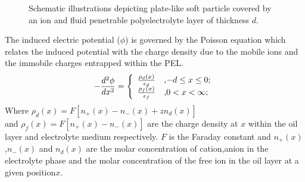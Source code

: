 \documentclass[11 pt]{article}
\begin{document}
\begin{figure}

\begin{center}

\caption {\label{Fig1} Schematic illustrations depicting  plate-like soft particle covered by an ion and fluid penetrable polyelectrolyte layer of thickness $d$.  }
\end{center}
\end{figure}


The induced electric  potential ($\phi$) is governed by the Poisson equation which relates the induced potential with the charge density due to the mobile  ions and the immobile charges entrapped within the PEL.
\begin{equation}
 -\frac{d^{2}\phi}{d x^{2}}=\left\{
                                                                  \begin{array}{ll}
                                                                     \frac{\rho_{d}(x)}{\epsilon_{d}} & \hbox{,$-d \leq x \leq0$;} \\
                                                                     \frac{\rho_{f}(x)}{\epsilon_{f}} & \hbox{,$0 < x <\infty$;} \\
                                                                  \end{array}
                                                                 \right.
                                                               \label{1}
\end{equation}
Where $ {\rho_{d}(x)}=F[n_{+}(x)-n_{-}(x)+zn_{d}(x)]$ \\and $ {\rho_{f}(x)}=F[n_{+}(x)-n_{-}(x)]$ are the charge density at $x$ within the oil layer and electrolyte medium respectively. $F$ is the Faraday constant and $n_{+}(x)$ ,$n_{-}(x)$ and $n_{d}(x)$ are the molar concentration of cation,anion  in the electrolyte phase and the molar concentration of the free ion in the oil layer at a given position$x$.
\end{document}

